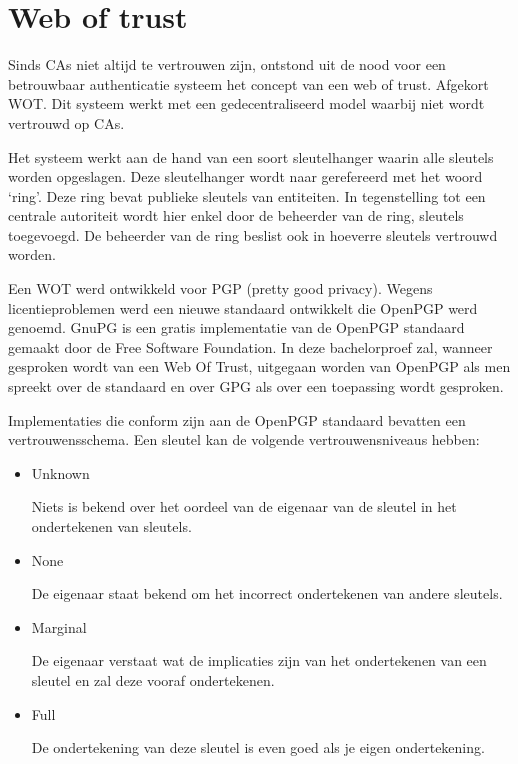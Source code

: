 \chapter{Web of trust}
\label{ch:web-of-trust}

Sinds CAs niet altijd te vertrouwen zijn, ontstond uit de nood voor een
betrouwbaar authenticatie systeem het concept van een web of trust. Afgekort
WOT. Dit systeem werkt met een gedecentraliseerd model waarbij niet wordt
vertrouwd op CAs.

Het systeem werkt aan de hand van een soort sleutelhanger waarin alle sleutels
worden opgeslagen. Deze sleutelhanger wordt naar gerefereerd met het woord
‘ring’. Deze ring bevat publieke sleutels van entiteiten. In tegenstelling tot
een centrale autoriteit wordt hier enkel door de beheerder van de ring, sleutels
toegevoegd. De beheerder van de ring beslist ook in hoeverre sleutels vertrouwd
worden.

Een WOT werd ontwikkeld voor PGP (pretty good privacy). Wegens licentieproblemen
werd een nieuwe standaard ontwikkelt die OpenPGP werd genoemd. GnuPG is een
gratis implementatie van de OpenPGP standaard gemaakt door de Free Software
Foundation. In deze bachelorproef zal, wanneer gesproken wordt van een Web Of
Trust, uitgegaan worden van OpenPGP als men spreekt over de standaard en over
GPG als over een toepassing wordt gesproken.

Implementaties die conform zijn aan de OpenPGP standaard bevatten een
vertrouwensschema. Een sleutel kan de volgende vertrouwensniveaus hebben:

\begin{itemize}
	\item Unknown

	Niets is bekend over het oordeel van de eigenaar van de sleutel in het
	ondertekenen van sleutels.

	\item None

	De eigenaar staat bekend om het incorrect ondertekenen van andere sleutels.

	\item Marginal

	De eigenaar verstaat wat de implicaties zijn van het ondertekenen van een
	sleutel en zal deze vooraf ondertekenen.

	\item Full

	De ondertekening van deze sleutel is even goed als je eigen ondertekening.
	\autocite{GNUManual}
\end{itemize}

